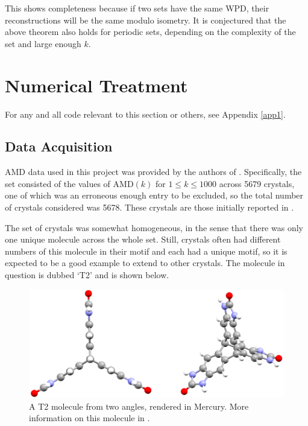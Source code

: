 \documentclass[11pt]{article}
\theoremstyle{definition}
\begin{document}
This shows completeness because if two sets have the same WPD, their reconstructions will be the same modulo isometry. It is conjectured that the above theorem also holds for periodic sets, depending on the complexity of the set and large enough $k$.

\newpage

\section{Numerical Treatment}

For any and all code relevant to this section or others, see Appendix \ref{app1}.

\subsection{Data Acquisition}\label{data-acq}

AMD data used in this project was provided by the authors of \cite{2020-Mosca-Kurlin}. Specifically, the set consisted of the values of AMD$(k)$ for $1\leq k \leq 1000$ across 5679 crystals, one of which was an erroneous enough entry to be excluded, so the total number of crystals considered was 5678. These crystals are those initially reported in \cite{Nature}.

The set of crystals was somewhat homogeneous, in the sense that there was only one unique molecule across the whole set. Still, crystals often had different numbers of this molecule in their motif and each had a unique motif, so it is expected to be a good example to extend to other crystals. The molecule in question is dubbed `T2' and is shown below.

\begin{figure}[h]
\centering
\includegraphics[scale=0.33]{job_03351.png}
\caption{A T2 molecule from two angles, rendered in Mercury. More information on this molecule in \cite{T2}.}
\end{figure}
\end{document}
